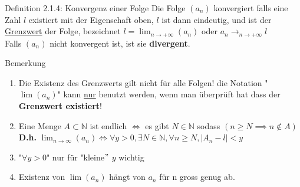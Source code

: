 \documentclass[a4paper,10pt]{article}
\begin{document}
\begin{defbox}{Definition 2.1.4: Konvergenz einer Folge}
Die Folge $(a_n)$ konvergiert falls eine Zahl $l$ existiert mit der Eigenschaft oben, $l$ ist dann eindeutig, und ist der \underline{Grenzwert} der Folge, bezeichnet 
$l=\lim_{n\to +\infty}(a_n)$ oder $a_n\longrightarrow_{n\to +\infty} l$\\
Falls $(a_n)$ nicht konvergent ist, ist sie \textbf{divergent}.
\end{defbox}

\begin{bembox}{Bemerkung}
\begin{enumerate}
    \item Die Existenz des Grenzwerts gilt nicht für alle Folgen! die Notation "$\lim(a_n)$" kann \underline{nur} benutzt werden, wenn man überprüft hat dass der \textbf{Grenzwert existiert}!
    \item Eine Menge $ A  \subset \mathbb{N}$ ist endlich $\iff$ es gibt $N\in \mathbb{N}$ sodass $ (n\ge N \implies n\notin A) $\\
    \textbf{D.h.} $\lim_{n\to\infty}(a_n)\iff\forall y >0, \exists N \in \mathbb{N}, \forall n \ge N, |A_n-l|< y$ 
    \item "$\forall y > 0 $" nur für "kleine$"$ $y$ wichtig
    \item Existenz von $\lim(a_n)$ hängt von $a_n$ für n gross genug ab.
\end{enumerate}
\end{bembox}
\end{document}
